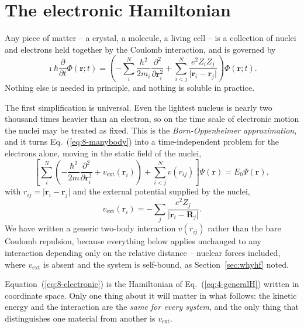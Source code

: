 \section{The electronic Hamiltonian}
\label{sec:electronichamiltonian}

Any piece of matter -- a crystal, a molecule, a living cell -- is a collection
of nuclei and electrons held together by the Coulomb interaction, and is
governed by
\begin{equation}
  \imath\hbar\frac{\partial}{\partial t}\Phi(\bm{r};t)
   = \left(-\sum_{i}^{N}\frac{\hbar^2}{2m_i}
     \frac{\partial^2}{\partial\bm{r}_i^2}
     + \sum_{i<j}^{N}\frac{e^2Z_iZ_j}{\vert\bm{r}_i-\bm{r}_j\vert}
     \right)\Phi(\bm{r};t).
  \label{eq:8-manybody}
\end{equation}
Nothing else is needed in principle, and nothing is soluble in practice.

The first simplification is universal.  Even the lightest nucleus is nearly
two thousand times heavier than an electron, so on the time scale of electronic
motion the nuclei may be treated as fixed.  This is the
\emph{Born-Oppenheimer approximation}, and it turns
Eq.~(\ref{eq:8-manybody}) into a time-independent problem for the electrons
alone, moving in the static field of the nuclei,
\begin{equation}
  \left[\sum_{i}^{N}\left(-\frac{\hbar^2}{2m}
    \frac{\partial^2}{\partial\bm{r}_i^2}
    + v_{\mathrm{ext}}(\bm{r}_i)\right)
    + \sum_{i<j}^{N}v(r_{ij})\right]\Psi(\bm{r}) = E_0\Psi(\bm{r}),
  \label{eq:8-electronic}
\end{equation}
with $r_{ij}=\vert\bm{r}_i-\bm{r}_j\vert$ and the external potential supplied
by the nuclei,
\begin{equation}
  v_{\mathrm{ext}}(\bm{r}_i) = -\sum_{j}\frac{e^2Z_j}{
    \vert\bm{r}_i-\bm{R}_j\vert}.
  \label{eq:8-vext}
\end{equation}
We have written a generic two-body interaction $v(r_{ij})$ rather than the
bare Coulomb repulsion, because everything below applies unchanged to any
interaction depending only on the relative distance -- nuclear forces
included, where $v_{\mathrm{ext}}$ is absent and the system is self-bound, as
Section~\ref{sec:whyhf} noted.

Equation~(\ref{eq:8-electronic}) is the Hamiltonian of
Eq.~(\ref{eq:4-generalH}) written in coordinate space.  Only one thing about
it will matter in what follows: the kinetic energy and the interaction are the
\emph{same for every system}, and the only thing that distinguishes one
material from another is $v_{\mathrm{ext}}$.

